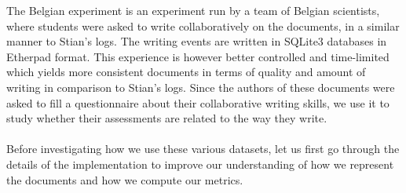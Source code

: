 \documentclass[a4, twocolumn, 12pt]{article}
\begin{document}
The Belgian experiment is an experiment run by a team of Belgian scientists, where students were asked to write collaboratively on the documents, in a similar manner to Stian’s logs. The writing events are written in SQLite3 databases in Etherpad format. This experience is however better controlled and time-limited which yields more consistent documents in terms of quality and amount of writing in comparison to Stian’s logs. Since the authors of these documents were asked to fill a questionnaire about their collaborative writing skills, we use it to study whether their assessments are related to the way they write.
\\\\
Before investigating how we use these various datasets, let us first go through the details of the implementation to improve our understanding of how we represent the documents and how we compute our metrics.
\end{document}
